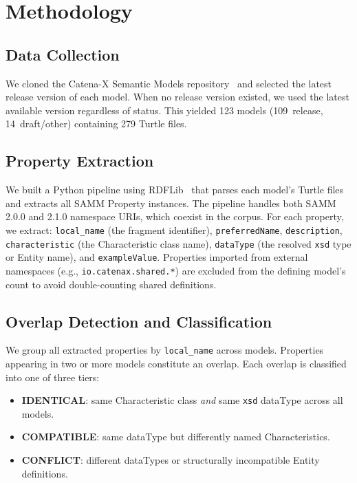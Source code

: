 \documentclass[]{ceurart}
\begin{document}
\section{Methodology}\label{sec:methodology}

\subsection{Data Collection}\label{sec:data-collection}

We cloned the Catena-X Semantic Models
repository~\cite{catenax2024models} and selected the latest release
version of each model. When no release version existed, we used the
latest available version regardless of status. This yielded 123 models
(109~release, 14~draft/other) containing 279 Turtle files.

\subsection{Property Extraction}\label{sec:extraction}

We built a Python pipeline using RDFLib~\cite{rdflib2024} that parses
each model's Turtle files and extracts all SAMM Property instances. The
pipeline handles both SAMM 2.0.0 and 2.1.0 namespace URIs, which coexist
in the corpus. For each property, we extract: \texttt{local\_name} (the
fragment identifier), \texttt{preferredName}, \texttt{description},
\texttt{characteristic} (the Characteristic class name),
\texttt{dataType} (the resolved \texttt{xsd} type or Entity name), and
\texttt{exampleValue}. Properties imported from external namespaces
(e.g., \texttt{io.catenax.shared.*}) are excluded from the defining
model's count to avoid double-counting shared definitions.

\subsection{Overlap Detection and Classification}\label{sec:classification}

We group all extracted properties by \texttt{local\_name} across models.
Properties appearing in two or more models constitute an overlap.
Each overlap is classified into one of three tiers:

\begin{itemize}
  \item \textbf{IDENTICAL}: same Characteristic class \emph{and} same
    \texttt{xsd} dataType across all models.
  \item \textbf{COMPATIBLE}: same dataType but differently named
    Characteristics.
  \item \textbf{CONFLICT}: different dataTypes or structurally
    incompatible Entity definitions.
\end{itemize}
\end{document}
